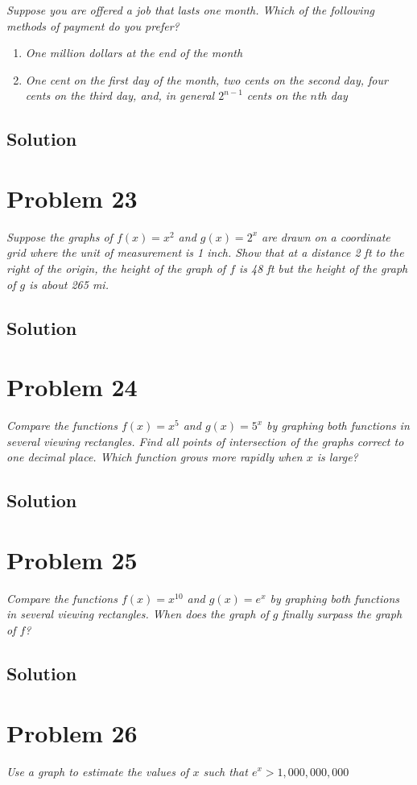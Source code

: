 \documentclass[11pt]{article}
\newcommand{\soln}{\subsection*}
\newcommand{\qn}{\textit}
\begin{document}
\qn{Suppose you are offered a job that lasts one month. Which of the following methods of payment do you prefer?}
\begin{enumerate}
	\item \qn{One million dollars at the end of the month}
	
	\item \qn{One cent on the first day of the month, two cents on the second day, four cents on the third day, and, in general $2^{n-1}$ cents on the $n$th day}
\end{enumerate}

\soln{Solution}

\section*{Problem 23}

\qn{Suppose the graphs of $f(x)=x^2$ and $g(x)=2^x$ are drawn on a coordinate grid where the unit of measurement is 1 inch. Show that at a distance 2 ft to the right of the origin, the height of the graph of $f$ is 48 ft but the height of the graph of $g$ is about 265 mi.}

\soln{Solution}

\section*{Problem 24}

\qn{Compare the functions $f(x)=x^5$ and $g(x)=5^x$ by graphing both functions in several viewing rectangles. Find all points of intersection of the graphs correct to one decimal place. Which function grows more rapidly when $x$ is large?}

\soln{Solution}

\section*{Problem 25}

\qn{Compare the functions $f(x)=x^{10}$ and $g(x)=e^x$ by graphing both functions in several viewing rectangles. When does the graph of $g$ finally surpass the graph of $f$?}

\soln{Solution}

\section*{Problem 26}

\qn{Use a graph to estimate the values of $x$ such that $e^x > 1,000,000,000$}
\end{document}
